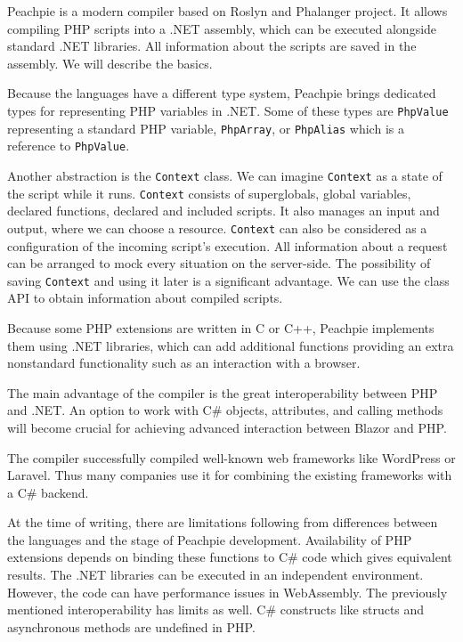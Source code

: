 Peachpie  is a modern compiler based on Roslyn and Phalanger project.
It allows compiling PHP scripts into a .NET assembly, which can be executed alongside standard .NET libraries.
All information about the scripts are saved in the assembly.
We will describe the basics.
\par
Because the languages have a different type system, Peachpie brings dedicated types for representing PHP variables in .NET.
Some of these types are \texttt{PhpValue} representing a standard PHP variable, \texttt{PhpArray}, or \texttt{PhpAlias} which is a reference to \texttt{PhpValue}.
\par
Another abstraction is the \texttt{Context} class.
We can imagine \texttt{Context} as a state of the script while it runs.
\texttt{Context} consists of superglobals, global variables, declared functions, declared and included scripts.
It also manages an input and output, where we can choose a resource.
\texttt{Context} can also be considered as a configuration of the incoming script's execution.
All information about a request can be arranged to mock every situation on the server-side.
The possibility of saving \texttt{Context} and using it later is a significant advantage.
We can use the class API to obtain information about compiled scripts.
\par
Because some PHP extensions are written in C or C++, Peachpie implements them using .NET libraries, which can add additional functions providing an extra nonstandard functionality such as an interaction with a browser.
\par
The main advantage of the compiler is the great interoperability between PHP and .NET.
An option to work with C\# objects, attributes, and calling methods will become crucial for achieving advanced interaction between Blazor and PHP.
\par
The compiler successfully compiled well-known web frameworks like WordPress or Laravel.
Thus many companies use it for combining the existing frameworks with a C\# backend.
\par
At the time of writing, there are limitations following from differences between the languages and the stage of Peachpie development.
Availability of PHP extensions depends on binding these functions to C\# code which gives equivalent results. 
The .NET libraries can be executed in an independent environment. 
However, the code can have performance issues in WebAssembly.
The previously mentioned interoperability has limits as well.
C\# constructs like structs and asynchronous methods are undefined in PHP.
